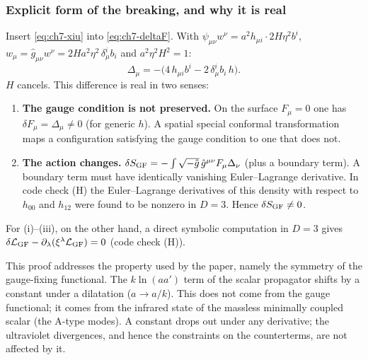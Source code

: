 \subsubsection{Explicit form of the breaking, and why it is real}
\tD{}
Insert \eqref{eq:ch7-xiu} into \eqref{eq:ch7-deltaF}.
With $\psi_{\mu\nu}w^\nu=a^2h_{\mu i}\cdot2H\eta^2b^i$, $w_\mu=\hat g_{\mu\nu}w^\nu=2Ha^2\eta^2\,\delta^i_\mu b_i$ and $a^2\eta^2H^2=1$:
\begin{equation}
\Delta_\mu=-\big(4\,h_{\mu i}b^i-2\,\delta^i_\mu b_i\,h\big).
\label{eq:ch7-Delta}
\end{equation}
$H$ cancels. This difference is real in two senses:
\begin{enumerate}[leftmargin=18pt]
\item \textbf{The gauge condition is not preserved.} On the surface $F_\mu=0$ one has $\delta F_\mu=\Delta_\mu\neq0$ (for generic $h$).
A spatial special conformal transformation maps a configuration satisfying the gauge condition to one that does not.
\item \textbf{The action changes.} $\delta S_{\rm GF}=-\int\sqrt{-\hat g}\,\hat g^{\mu\nu}F_\mu\Delta_\nu$ (plus a boundary term).
A boundary term must have identically vanishing Euler--Lagrange derivative.
In code check (H) the Euler--Lagrange derivatives of this density with respect to $h_{00}$ and $h_{12}$ were found to be nonzero in $D=3$. Hence $\delta S_{\rm GF}\neq0$.
\end{enumerate}
For (i)--(iii), on the other hand, a direct symbolic computation in $D=3$ gives $\delta\mathcal{L}_{\mathrm{GF}}-\partial_\lambda(\xi^\lambda\mathcal{L}_{\mathrm{GF}})=0$ (code check (H)).

\begin{notebox}
This proof addresses the property used by the paper, namely the symmetry of the gauge-fixing functional.
The $k\ln(aa')$ term of the scalar propagator shifts by a constant under a dilatation ($a\to a/k$).
This does not come from the gauge functional; it comes from the infrared state of the massless minimally coupled scalar (the A-type modes).
A constant drops out under any derivative; the ultraviolet divergences, and hence the constraints on the counterterms, are not affected by it.
\end{notebox}

